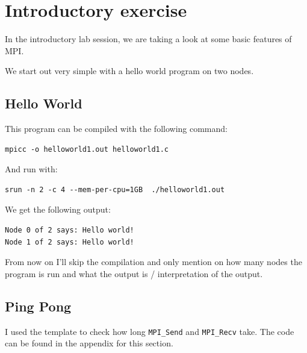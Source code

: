 \setcounter{section}{-1}
\section{Introductory exercise}
In the introductory lab session, we are taking a look at some basic features of MPI. 

We start out very simple with a hello world program on two nodes. 

\subsection*{Hello World}

This program can be compiled with the following command:\\

\begin{verbatim}
mpicc -o helloworld1.out helloworld1.c
\end{verbatim}
And run with:
\begin{verbatim}
srun -n 2 -c 4 --mem-per-cpu=1GB  ./helloworld1.out
\end{verbatim}
We get the following output:
\begin{verbatim}
Node 0 of 2 says: Hello world!
Node 1 of 2 says: Hello world!
\end{verbatim}

From now on I'll skip the compilation and only mention on how many nodes the program is run and what the output is / interpretation of the output.

\subsection{Ping Pong}
I used the template to check how long \texttt{MPI\_Send} and \texttt{MPI\_Recv} take. The code can be found in the appendix for this section. \\

